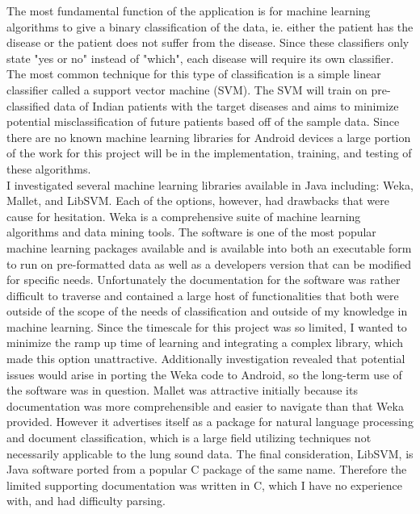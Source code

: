\documentclass{article}
\begin{document}
 The most fundamental function of the application is for machine learning algorithms to give a binary classification of the data, ie. either the patient has the disease or the patient does not suffer from the disease. Since these classifiers only state "yes or no" instead of "which", each disease will require its own classifier. The most common technique for this type of classification is a simple linear classifier called a support vector machine (SVM). The SVM will train on pre-classified data of Indian patients with the target diseases and aims to minimize potential misclassification of future patients based off of the sample data. Since there are no known machine learning libraries for Android devices a large portion of the work for this project will be in the implementation, training, and testing of these algorithms.\\
 
 I investigated several machine learning libraries available in Java including: Weka, Mallet, and LibSVM. Each of the options, however, had drawbacks that were cause for hesitation. Weka is a comprehensive suite of machine learning algorithms and data mining tools. The software is one of the most popular machine learning packages available and is available into both an executable form to run on pre-formatted data as well as a developers version that can be modified for specific needs. Unfortunately the documentation for the software was rather difficult to traverse and contained a large host of functionalities that both were outside of the scope of the needs of classification and outside of my knowledge in machine learning. Since the timescale for this project was so limited, I wanted to minimize the ramp up time of learning and integrating a complex library, which made this option unattractive. Additionally investigation revealed that potential issues would arise in porting the Weka code to Android, so the long-term use of the software was in question. Mallet was attractive initially because its documentation was more comprehensible and easier to navigate than that Weka provided. However it advertises itself as a package for natural language processing and document classification, which is a large field utilizing techniques not necessarily applicable to the lung sound data. The final consideration, LibSVM, is Java software ported from a popular C package of the same name. Therefore the limited supporting documentation was written in C, which I have no experience with, and had difficulty parsing.\\
 
\end{document}
